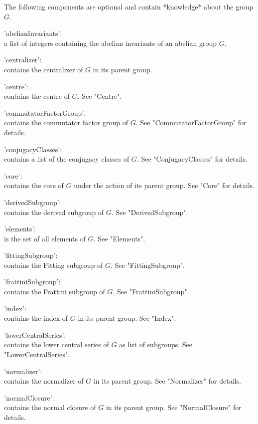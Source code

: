 The following components  are optional and  contain *knowledge* about the
group $G$.

'abelianInvariants': \\
        a  list  of  integers  containing  the  abelian  invariants of an
        abelian group $G$.

'centralizer': \\
        contains the centralizer of $G$ in its parent group.

'centre': \\
        contains the centre of $G$. See "Centre".

'commutatorFactorGroup': \\
        contains     the commutator   factor   group   of     $G$.    See
        "CommutatorFactorGroup" for details.

'conjugacyClasses': \\
        contains   a  list  of   the conjugacy   classes   of  $G$.   See
        "ConjugacyClasses" for details.

'core': \\
        contains the core of $G$ under the action of  its  parent  group.
        See "Core" for details.

'derivedSubgroup':  \\   
        contains the derived subgroup of $G$. See "DerivedSubgroup".

'elements': \\
        is the set of all elements of $G$. See "Elements".

'fittingSubgroup': \\
        contains the Fitting subgroup of $G$. See "FittingSubgroup".

'frattiniSubgroup': \\
        contains the Frattini subgroup of $G$.  See "FrattiniSubgroup".

'index': \\
        contains the index of $G$ in its parent group. See "Index".

'lowerCentralSeries': \\
        contains the lower  central series of  $G$  as list of subgroups.
        See "LowerCentralSeries".

'normalizer': \\
        contains  the   normalizer  of  $G$  in  its  parent  group.  See
        "Normalizer" for details.

'normalClosure': \\
        contains the normal closure of  $G$  in  its  parent  group.  See
        "NormalClosure" for details.

